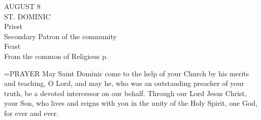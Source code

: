 \begin{center}\normalsize AUGUST 8\\
\footnotesize ST. DOMINIC\\
\footnotesize Priest\\
\footnotesize Secondary Patron of the community\\
\footnotesize Feast\\
\footnotesize From the common of Religious p. \\
\end{center}

\hangindent=\parindent \small{PRAYER 
May Saint Dominic come to the help of your Church
by his merits and teaching, O Lord,
and may he, who was an outstanding preacher of your truth,
be a devoted intercessor on our behalf.
Through our Lord Jesus Christ, your Son,
who lives and reigns with you in the unity of the Holy Spirit,
one God, for ever and ever.\\}
 
